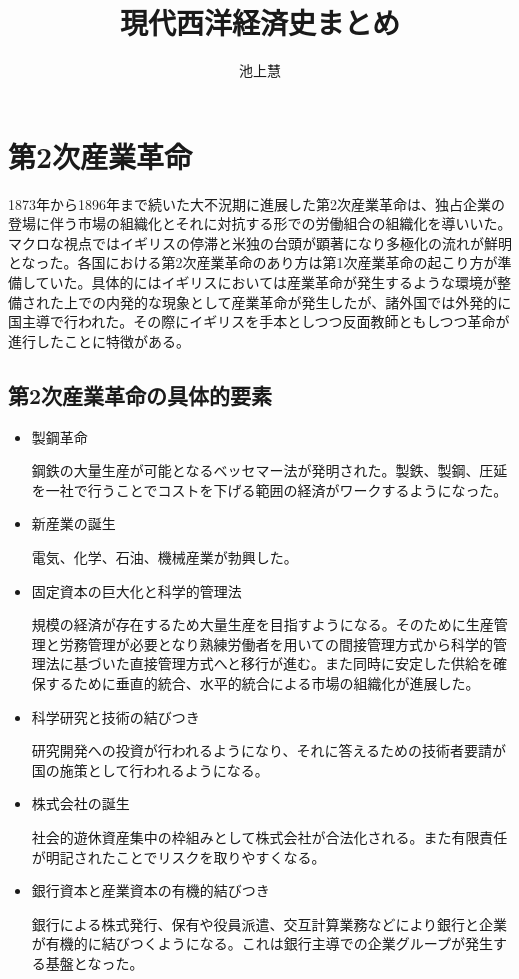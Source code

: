 \documentclass{jsarticle}
\begin{document}
\title{現代西洋経済史まとめ}
\author{池上慧}
\maketitle

\section{第2次産業革命}
1873年から1896年まで続いた大不況期に進展した第2次産業革命は、独占企業の登場に伴う市場の組織化とそれに対抗する形での労働組合の組織化を導いいた。マクロな視点ではイギリスの停滞と米独の台頭が顕著になり多極化の流れが鮮明となった。各国における第2次産業革命のあり方は第1次産業革命の起こり方が準備していた。具体的にはイギリスにおいては産業革命が発生するような環境が整備された上での内発的な現象として産業革命が発生したが、諸外国では外発的に国主導で行われた。その際にイギリスを手本としつつ反面教師ともしつつ革命が進行したことに特徴がある。
\subsection{第2次産業革命の具体的要素}
\begin{itemize}
\item 製鋼革命

鋼鉄の大量生産が可能となるベッセマー法が発明された。製鉄、製鋼、圧延を一社で行うことでコストを下げる範囲の経済がワークするようになった。
\item 新産業の誕生

電気、化学、石油、機械産業が勃興した。
\item 固定資本の巨大化と科学的管理法

規模の経済が存在するため大量生産を目指すようになる。そのために生産管理と労務管理が必要となり熟練労働者を用いての間接管理方式から科学的管理法に基づいた直接管理方式へと移行が進む。また同時に安定した供給を確保するために垂直的統合、水平的統合による市場の組織化が進展した。
\item 科学研究と技術の結びつき

研究開発への投資が行われるようになり、それに答えるための技術者要請が国の施策として行われるようになる。
\item 株式会社の誕生

社会的遊休資産集中の枠組みとして株式会社が合法化される。また有限責任が明記されたことでリスクを取りやすくなる。
\item 銀行資本と産業資本の有機的結びつき

銀行による株式発行、保有や役員派遣、交互計算業務などにより銀行と企業が有機的に結びつくようになる。これは銀行主導での企業グループが発生する基盤となった。
\end{itemize}
\end{document}
